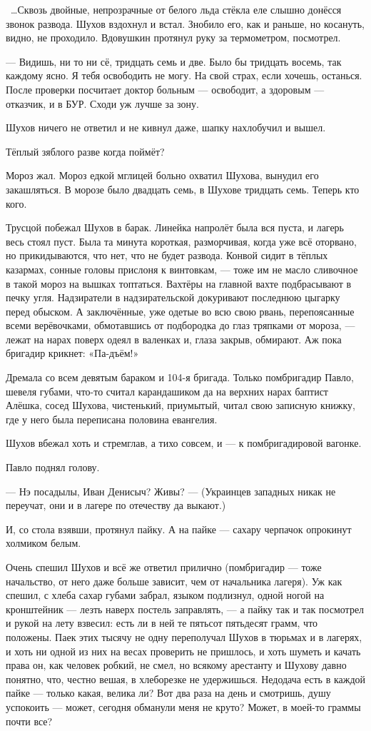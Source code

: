 ~\dots{}Сквозь двойные, непрозрачные от белого льда стёкла еле слышно донёсся звонок развода. Шухов вздохнул и встал. Знобило его, как и раньше, но косануть, видно, не проходило. Вдовушкин протянул руку за термометром, посмотрел.

--- Видишь, ни то ни сё, тридцать семь и две. Было бы тридцать восемь, так каждому ясно. Я тебя освободить не могу. На свой страх, если хочешь, останься. После проверки посчитает доктор больным --- освободит, а здоровым --- отказчик, и в БУР. Сходи уж лучше за зону.

Шухов ничего не ответил и не кивнул даже, шапку нахлобучил и вышел.

Тёплый зяблого разве когда поймёт?

Мороз жал. Мороз едкой мглицей больно охватил Шухова, вынудил его закашляться. В морозе было двадцать семь, в Шухове тридцать семь. Теперь кто кого.

Трусцой побежал Шухов в барак. Линейка напролёт была вся пуста, и лагерь весь стоял пуст. Была та минута короткая, разморчивая, когда уже всё оторвано, но прикидываются, что нет, что не будет развода. Конвой сидит в тёплых казармах, сонные головы прислоня к винтовкам, --- тоже им не масло сливочное в такой мороз на вышках топтаться. Вахтёры на главной вахте подбрасывают в печку угля. Надзиратели в надзирательской докуривают последнюю цыгарку перед обыском. А заключённые, уже одетые во всю свою рвань, перепоясанные всеми верёвочками, обмотавшись от подбородка до глаз тряпками от мороза, --- лежат на нарах поверх одеял в валенках и, глаза закрыв, обмирают. Аж пока бригадир крикнет: «Па-дъём!»

Дремала со всем девятым бараком и 104-я бригада. Только помбригадир Павло, шевеля губами, что-то считал карандашиком да на верхних нарах баптист Алёшка, сосед Шухова, чистенький, приумытый, читал свою записную книжку, где у него была переписана половина евангелия.

Шухов вбежал хоть и стремглав, а тихо совсем, и --- к помбригадировой вагонке.

Павло поднял голову.

--- Нэ посадылы, Иван Денисыч? Живы? --- (Украинцев западных никак не переучат, они и в лагере по отечеству да выкают.)

И, со стола взявши, протянул пайку. А на пайке --- сахару черпачок опрокинут холмиком белым.

Очень спешил Шухов и всё же ответил прилично (помбригадир --- тоже начальство, от него даже больше зависит, чем от начальника лагеря). Уж как спешил, с хлеба сахар губами забрал, языком подлизнул, одной ногой на кронштейник --- лезть наверх постель заправлять, --- а пайку так и так посмотрел и рукой на лету взвесил: есть ли в ней те пятьсот пятьдесят грамм, что положены. Паек этих тысячу не одну переполучал Шухов в тюрьмах и в лагерях, и хоть ни одной из них на весах проверить не пришлось, и хоть шуметь и качать права он, как человек робкий, не смел, но всякому арестанту и Шухову давно понятно, что, честно вешая, в хлеборезке не удержишься. Недодача есть в каждой пайке --- только какая, велика ли? Вот два раза на день и смотришь, душу успокоить --- может, сегодня обманули меня не круто? Может, в моей-то граммы почти все?


